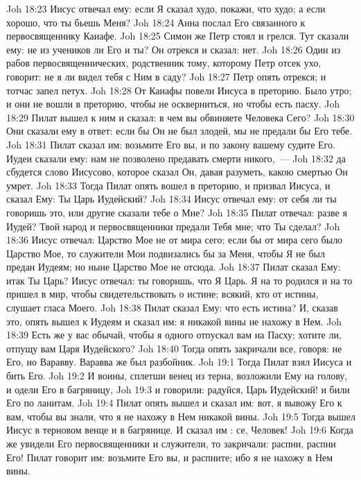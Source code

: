 \vs Joh 18:23 Иисус отвечал ему: если Я сказал худо, покажи, что худо; а если хорошо, что ты бьешь Меня?
\vs Joh 18:24 Анна послал Его связанного к первосвященнику Каиафе.
\rsbpar\vs Joh 18:25 Симон же Петр стоял и грелся. Тут сказали ему: не из учеников ли Его и ты? Он отрекся и сказал: нет.
\vs Joh 18:26 Один из рабов первосвященнических, родственник тому, которому Петр отсек ухо, говорит: не я ли видел тебя с Ним в саду?
\vs Joh 18:27 Петр опять отрекся; и тотчас запел петух.
\rsbpar\vs Joh 18:28 От Каиафы повели Иисуса в преторию. Было утро; и они не вошли в преторию, чтобы не оскверниться, но чтобы  есть пасху.
\vs Joh 18:29 Пилат вышел к ним и сказал: в чем вы обвиняете Человека Сего?
\vs Joh 18:30 Они сказали ему в ответ: если бы Он не был злодей, мы не предали бы Его тебе.
\vs Joh 18:31 Пилат сказал им: возьмите Его вы, и по закону вашему судите Его. Иудеи сказали ему: нам не позволено предавать смерти никого,~---
\rsbpar\vs Joh 18:32 да сбудется слово Иисусово, которое сказал Он, давая разуметь, какою смертью Он умрет.
\vs Joh 18:33 Тогда Пилат опять вошел в преторию, и призвал Иисуса, и сказал Ему: Ты Царь Иудейский?
\vs Joh 18:34 Иисус отвечал ему: от себя ли ты говоришь это, или другие сказали тебе о Мне?
\vs Joh 18:35 Пилат отвечал: разве я Иудей? Твой народ и первосвященники предали Тебя мне; что Ты сделал?
\vs Joh 18:36 Иисус отвечал: Царство Мое не от мира сего; если бы от мира сего было Царство Мое, то служители Мои подвизались бы за Меня, чтобы Я не был предан Иудеям; но ныне Царство Мое не отсюда.
\vs Joh 18:37 Пилат сказал Ему: итак Ты Царь? Иисус отвечал: ты говоришь, что Я Царь. Я на то родился и на то пришел в мир, чтобы свидетельствовать о истине; всякий, кто от истины, слушает гласа Моего.
\vs Joh 18:38 Пилат сказал Ему: что есть истина? И, сказав это, опять вышел к Иудеям и сказал им: я никакой вины не нахожу в Нем.
\vs Joh 18:39 Есть же у вас обычай, чтобы я одного отпускал вам на Пасху; хотите ли, отпущу вам Царя Иудейского?
\vs Joh 18:40 Тогда опять закричали все, говоря: не Его, но Варавву. Варавва же был разбойник.
\vs Joh 19:1 Тогда Пилат взял Иисуса и  бить Его.
\vs Joh 19:2 И воины, сплетши венец из терна, возложили Ему на голову, и одели Его в багряницу,
\vs Joh 19:3 и говорили: радуйся, Царь Иудейский! и били Его по ланитам.
\vs Joh 19:4 Пилат опять вышел и сказал им: вот, я вывожу Его к вам, чтобы вы знали, что я не нахожу в Нем никакой вины.
\vs Joh 19:5 Тогда вышел Иисус в терновом венце и в багрянице. И сказал им : се, Человек!
\vs Joh 19:6 Когда же увидели Его первосвященники и служители, то закричали: распни, распни Его! Пилат говорит им: возьмите Его вы, и распните; ибо я не нахожу в Нем вины.
